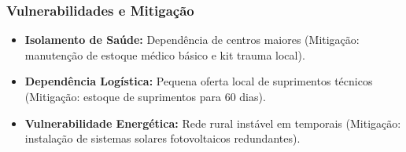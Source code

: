 \subsubsection{Vulnerabilidades e
Mitigação}

\begin{itemize}
\tightlist
\item
  \textbf{Isolamento de Saúde:} Dependência de centros maiores
  (Mitigação: manutenção de estoque médico básico e kit trauma local).
\item
  \textbf{Dependência Logística:} Pequena oferta local de suprimentos
  técnicos (Mitigação: estoque de suprimentos para 60 dias).
\item
  \textbf{Vulnerabilidade Energética:} Rede rural instável em temporais
  (Mitigação: instalação de sistemas solares fotovoltaicos redundantes).
\end{itemize}

